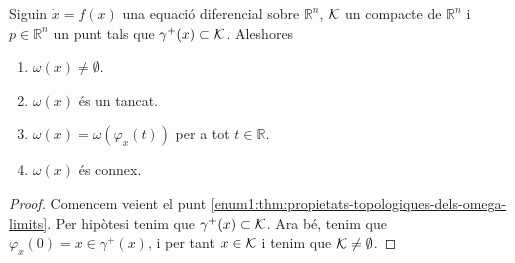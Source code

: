 \documentclass[../equacions-diferencials-II.tex]{subfiles}
\begin{document}
    \begin{theorem}
        \label{thm:propietats-topologiques-dels-omega-limits}
        Siguin
        \(\dot{x}=f(x)\)
        una equació diferencial sobre \(\mathbb{R}^{n}\), \(\mathcal{K}\) un compacte de \(\mathbb{R}^{n}\) i \(p\in\mathbb{R}^{n}\) un punt tals que \(\gamma^{+}(x)\subset\mathcal{K}\).
        Aleshores
        \begin{enumerate}
            \item\label{enum1:thm:propietats-topologiques-dels-omega-limits} \(\omega(x)\neq\emptyset\).
            \item\label{enum2:thm:propietats-topologiques-dels-omega-limits} \(\omega(x)\) és un tancat.
            \item\label{enum3:thm:propietats-topologiques-dels-omega-limits} \(\omega(x)=\omega(\varphi_{x}(t))\) per a tot \(t\in\mathbb{R}\).
            \item\label{enum4:thm:propietats-topologiques-dels-omega-limits} \(\omega(x)\) és connex.
        \end{enumerate}
    \end{theorem}
    \begin{proof}
        Comencem veient el punt \eqref{enum1:thm:propietats-topologiques-dels-omega-limits}.
        Per hipòtesi tenim que \(\gamma^{+}(x)\subset\mathcal{K}\).
        Ara bé, tenim que \(\varphi_{x}(0)=x\in\gamma^{+}(x)\), i per tant \(x\in\mathcal{K}\) i tenim que \(\mathcal{K}\neq\emptyset\).
    \end{proof}
\end{document}
